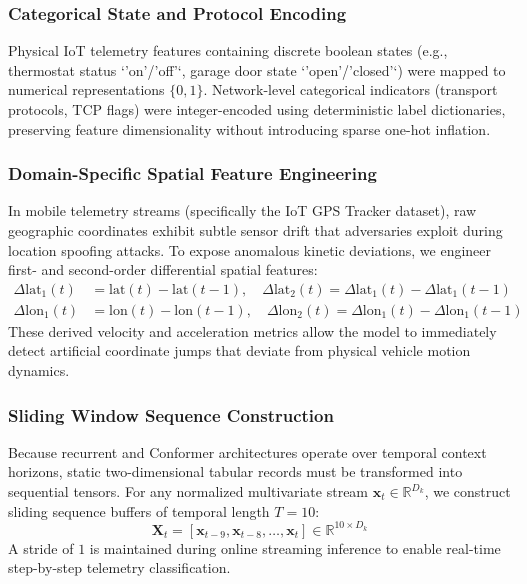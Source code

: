 \documentclass[11pt,a4paper]{article}
\begin{document}
\subsubsection{Categorical State and Protocol Encoding}
Physical IoT telemetry features containing discrete boolean states (e.g., thermostat status `'on'/'off'`, garage door state `'open'/'closed'`) were mapped to numerical representations $\{0, 1\}$. Network-level categorical indicators (transport protocols, TCP flags) were integer-encoded using deterministic label dictionaries, preserving feature dimensionality without introducing sparse one-hot inflation.

\subsubsection{Domain-Specific Spatial Feature Engineering}
In mobile telemetry streams (specifically the IoT GPS Tracker dataset), raw geographic coordinates exhibit subtle sensor drift that adversaries exploit during location spoofing attacks. To expose anomalous kinetic deviations, we engineer first- and second-order differential spatial features:
\begin{align}
    \Delta \text{lat}_1(t) &= \text{lat}(t) - \text{lat}(t-1), \quad \Delta \text{lat}_2(t) = \Delta \text{lat}_1(t) - \Delta \text{lat}_1(t-1) \\
    \Delta \text{lon}_1(t) &= \text{lon}(t) - \text{lon}(t-1), \quad \Delta \text{lon}_2(t) = \Delta \text{lon}_1(t) - \Delta \text{lon}_1(t-1)
\end{align}
These derived velocity and acceleration metrics allow the model to immediately detect artificial coordinate jumps that deviate from physical vehicle motion dynamics.

\subsubsection{Sliding Window Sequence Construction}
Because recurrent and Conformer architectures operate over temporal context horizons, static two-dimensional tabular records must be transformed into sequential tensors. For any normalized multivariate stream $\mathbf{x}_t \in \mathbb{R}^{D_k}$, we construct sliding sequence buffers of temporal length $T = 10$:
\begin{equation}
    \mathbf{X}_t = \left[ \mathbf{x}_{t-9}, \mathbf{x}_{t-8}, \dots, \mathbf{x}_t \right] \in \mathbb{R}^{10 \times D_k}
    \label{eq:sequence_buffer}
\end{equation}
A stride of $1$ is maintained during online streaming inference to enable real-time step-by-step telemetry classification.
\end{document}
